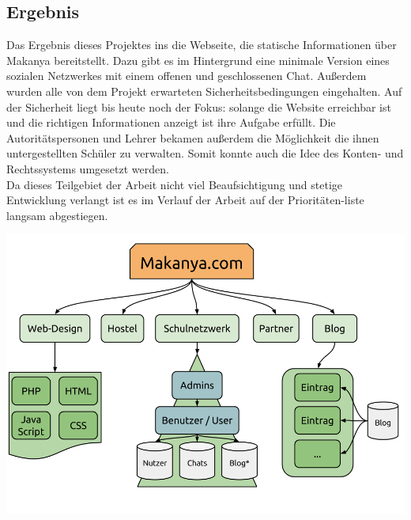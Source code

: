 \subsection{Ergebnis} %
Das Ergebnis dieses Projektes ins die Webseite, die statische Informationen über Makanya bereitstellt.
Dazu gibt es im Hintergrund eine minimale Version eines sozialen Netzwerkes mit einem offenen und geschlossenen Chat.
Außerdem wurden alle von dem Projekt erwarteten Sicherheitsbedingungen eingehalten.
Auf der Sicherheit liegt bis heute noch der Fokus:
solange die Website erreichbar ist und die richtigen Informationen anzeigt ist ihre Aufgabe erfüllt.
Die Autoritätspersonen und Lehrer bekamen außerdem die Möglichkeit die ihnen untergestellten Schüler zu verwalten.
Somit konnte auch die Idee des Konten- und Rechtssystems umgesetzt werden.\\
Da dieses Teilgebiet der Arbeit nicht viel Beaufsichtigung und stetige Entwicklung verlangt ist
es im Verlauf der Arbeit auf der Prioritäten-liste langsam abgestiegen.
\begin{center}
\includegraphics[width=\linewidth]{imgs/makanyaOverview.png}
\end{center}
